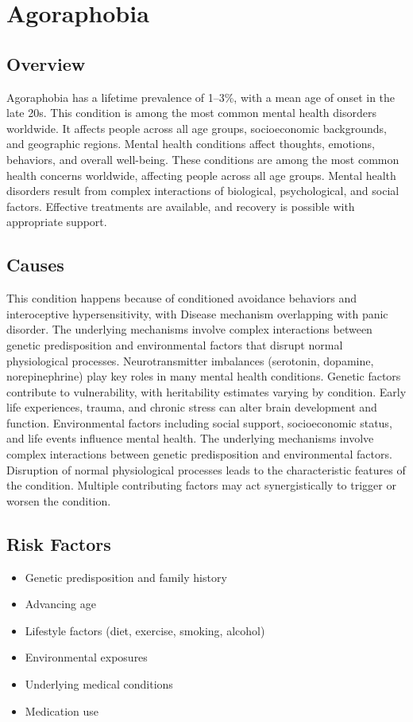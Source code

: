 \chapter{Agoraphobia}
\label{sec:Agoraphobia}

\section{Overview}
Agoraphobia has a lifetime prevalence of 1--3\%, with a mean age of onset in the late 20s. This condition is among the most common mental health disorders worldwide. It affects people across all age groups, socioeconomic backgrounds, and geographic regions. Mental health conditions affect thoughts, emotions, behaviors, and overall well-being. These conditions are among the most common health concerns worldwide, affecting people across all age groups. Mental health disorders result from complex interactions of biological, psychological, and social factors. Effective treatments are available, and recovery is possible with appropriate support.
\section{Causes}
This condition happens because of conditioned avoidance behaviors and interoceptive hypersensitivity, with Disease mechanism overlapping with panic disorder. The underlying mechanisms involve complex interactions between genetic predisposition and environmental factors that disrupt normal physiological processes. Neurotransmitter imbalances (serotonin, dopamine, norepinephrine) play key roles in many mental health conditions. Genetic factors contribute to vulnerability, with heritability estimates varying by condition. Early life experiences, trauma, and chronic stress can alter brain development and function. Environmental factors including social support, socioeconomic status, and life events influence mental health. The underlying mechanisms involve complex interactions between genetic predisposition and environmental factors. Disruption of normal physiological processes leads to the characteristic features of the condition. Multiple contributing factors may act synergistically to trigger or worsen the condition.
\section{Risk Factors}
\begin{itemize}[noitemsep]
  \item Genetic predisposition and family history
  \item Advancing age
  \item Lifestyle factors (diet, exercise, smoking, alcohol)
  \item Environmental exposures
  \item Underlying medical conditions
  \item Medication use
\end{itemize}
